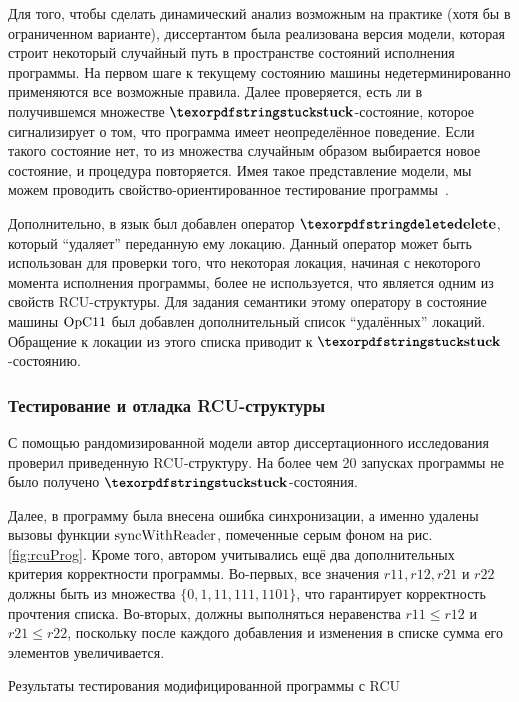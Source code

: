 Для того, чтобы сделать динамический анализ возможным на практике (хотя бы в ограниченном варианте),
диссертантом была реализована версия модели, которая строит некоторый случайный путь в пространстве состояний исполнения программы.
На первом шаге к текущему состоянию машины недетерминированно применяются все возможные правила.
Далее проверяется, есть ли в получившемся множестве $\kw{stuck}$-состояние, которое сигнализирует о том, что
программа имеет неопределённое поведение. Если такого состояние нет, то из множества случайным образом выбирается
новое состояние, и процедура повторяется.
Имея такое представление модели, мы можем проводить свойство-ориентированное тестирование программы~\cite{Hritcu-al:ICFP13}.

Дополнительно, в язык был добавлен оператор $\kw{delete}$, который ``удаляет'' переданную ему локацию.
Данный оператор может быть использован для проверки того, что некоторая локация, начиная с некоторого момента исполнения программы,
более не используется, что является одним из свойств RCU-структуры.
Для задания семантики этому оператору в состояние машины $\mathrm{OpC11}$ был добавлен дополнительный список ``удалённых'' локаций.
Обращение к локации из этого списка приводит к $\kw{stuck}$-состоянию.

\subsubsection{Тестирование и отладка RCU-структуры}
С помощью рандомизированной модели автор диссертационного исследования проверил приведенную RCU-структуру.
На более чем 20 запусках программы не было получено $\kw{stuck}$-состояния.

Далее, в программу была внесена ошибка синхронизации, а именно удалены вызовы функции ${\rm syncWithReader}$,
помеченные серым фоном на рис. \ref{fig:rcuProg}.
Кроме того, автором учитывались ещё два дополнительных критерия корректности программы.
Во-первых, все значения $r11, r12, r21$ и $r22$ должны быть из множества $\{0, 1, 11, 111, 1101\}$,
что гарантирует корректность прочтения списка.
Во-вторых, должны выполняться неравенства $r11 \le r12$ и $r21 \le r22$, поскольку после каждого добавления и
изменения в списке сумма его элементов увеличивается.

\begin{table}
\centering
  
\caption{Результаты тестирования модифицированной программы с RCU}
\label{fig:tblRun}
\end{table}

